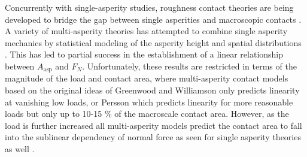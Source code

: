 
Concurrently with single-asperity studies, roughness contact theories are being developed \cite{PhysRevLett.100.055504, Persson, GW, BUSH197587} to bridge the gap between single asperities and macroscopic contacts \cite{mo_friction_2009}. A variety of multi-asperity theories has attempted to combine single asperity
mechanics by statistical modeling of the asperity height and spatial
distributions \cite{CARBONE20082555}. This has led to partial success in the establishment of a linear relationship between $A_{\text{asp}}$ and $F_N$. Unfortunately, these results are restricted
in terms of the magnitude of the load and contact area, where multi-asperity
contact models based on the original ideas of Greenwood and Williamson \cite{GW}
only predicts linearity at vanishing low loads, or Persson \cite{Persson} which predicts linearity for more reasonable loads but only up to 10-15 \% of the macroscale contact area. However, as the load is further increased all multi-asperity models
predict the contact area to fall into the sublinear dependency of normal force
as seen for single asperity theories as well \cite{CARBONE20082555}.







